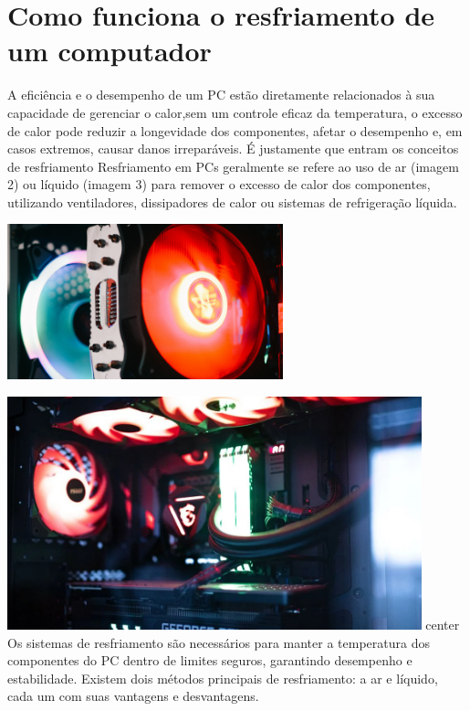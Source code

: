 \documentclass{article}
\begin{document}
\section{Como funciona o resfriamento de um computador}
A eficiência e o desempenho de um PC estão diretamente relacionados à sua capacidade de gerenciar o calor,sem um controle eficaz da temperatura, o excesso de calor pode reduzir a longevidade dos componentes, afetar o desempenho e, em casos extremos, causar danos irreparáveis. É justamente que entram os conceitos de resfriamento
Resfriamento em PCs geralmente se refere ao uso de ar (imagem 2) ou líquido (imagem 3) para remover o excesso de calor dos componentes, utilizando ventiladores, dissipadores de calor ou sistemas de refrigeração líquida.
\begin{adjustbox}{center,caption={Air Cooler de computador em detalhe},nofloat=figure,vspace=\bigskipamount}
    \includegraphics[width=8cm]{cooler.png}

\end{adjustbox}
\begin{adjustbox}{center,caption={Computador Gamer que utiliza refrigeração liquida},nofloat=figure,vspace=\bigskipamount}
    \includegraphics[width=12cm]{gaymer.png}
\end{adjustbox}{center}
Os sistemas de resfriamento são necessários para manter a temperatura dos componentes do PC dentro de limites seguros, garantindo desempenho e estabilidade. Existem dois métodos principais de resfriamento: a ar e líquido, cada um com suas vantagens e desvantagens.
\end{document}
